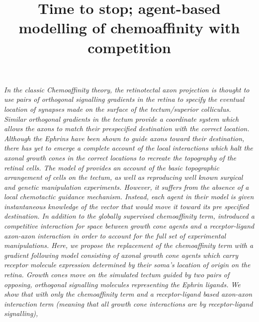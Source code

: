 \documentclass[11pt, a4paper]{article}
\title {
  Time to stop; agent-based modelling of chemoaffinity with competition
}
\date{} %
\author{\Authors}
\begin{document}
\setlength{\droptitle}{-1.8cm} %
\maketitle

\vspace{-1.8cm} %

\emph{In the classic Chemoaffinity theory, the retinotectal axon projection is
thought to use pairs of orthogonal signalling gradients in the retina to
specify the eventual location of synapses made on the surface of the
tectum/superior colliculus. Similar orthogonal gradients in the tectum provide
a coordinate system which allows the axons to match their prespecified
destination with the correct location. Although the Ephrins have been shown to
guide axons toward their destination, there has yet to emerge a complete
account of the local interactions which halt the axonal growth cones in the
correct locations to recreate the topography of the retinal cells. The model
of \citet{simpson_simple_2011} provides an account of the basic topographic
arrangement of cells on the tectum, as well as reproducing well known surgical
and genetic manipulation experiments. However, it suffers from the absence of
a local chemotactic guidance mechanism. Instead, each agent in their model is
given instantaneous knowledge of the vector that would move it toward its pre
specified destination. In addition to the globally supervised chemoaffinity
term, \citet{simpson_simple_2011} introduced a competitive interaction for
space between growth cone agents and a receptor-ligand axon-axon interaction
in order to account for the full set of experimental manipulations. Here, we
propose the replacement of the chemoaffinity term with a gradient following
model consisting of axonal growth cone agents which carry receptor molecule
expression determined by their soma's location of origin on the retina. Growth
cones move on the simulated tectum guided by two pairs of opposing, orthogonal
signalling molecules representing the Ephrin ligands. We show that with only
the chemoaffinity term and a receptor-ligand based axon-axon interaction term
(meaning that all growth cone interactions are by receptor-ligand signalling),
}
\end{document}
